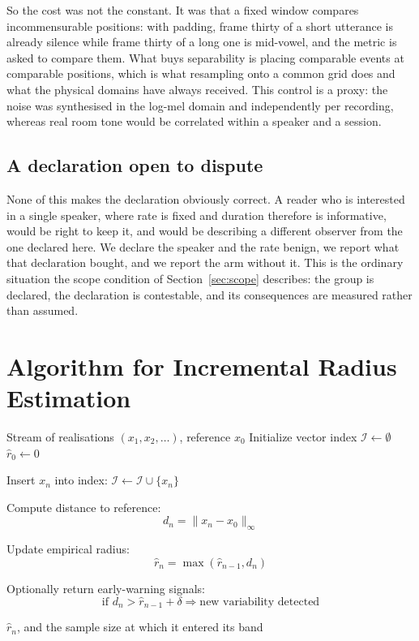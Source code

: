 \documentclass[10pt]{article}
\theoremstyle{plain}
\theoremstyle{definition}
\theoremstyle{remark}
\begin{document}
So the cost was not the constant. It was that a fixed window compares
incommensurable positions: with padding, frame thirty of a short utterance is
already silence while frame thirty of a long one is mid-vowel, and the metric
is asked to compare them. What buys separability is placing comparable events
at comparable positions, which is what resampling onto a common grid does and
what the physical domains have always received. This control is a proxy: the
noise was synthesised in the log-mel domain and independently per recording,
whereas real room tone would be correlated within a speaker and a session.

\subsection{A declaration open to dispute}

None of this makes the declaration obviously correct. A reader who is
interested in a single speaker, where rate is fixed and duration therefore is
informative, would be right to keep it, and would be describing a different
observer from the one declared here. We declare the speaker and the rate benign,
we report what that declaration bought, and we report the arm without it. This
is the ordinary situation the scope condition of Section~\ref{sec:scope}
describes: the group is declared, the declaration is contestable, and its
consequences are measured rather than assumed.


\section{Algorithm for Incremental Radius Estimation}\label{app:algorithm}
\begin{algorithm}[H]
\caption{Incremental Estimation of the Perceptual Radius}
\begin{algorithmic}[1]

\Require Stream of realisations $(x_1, x_2, \dots)$, reference $x_0$
\State Initialize vector index $\mathcal{I} \gets \emptyset$
\State $\hat r_0 \gets 0$


    \State Insert $x_n$ into index: $\mathcal{I} \gets \mathcal{I} \cup \{x_n\}$
    
    \State Compute distance to reference:
    \[
       d_n = \|x_n - x_0\|_\infty
    \]
    
    \State Update empirical radius:
    \[
        \hat r_n = \max(\hat r_{n-1}, d_n)
    \]
    
    \State Optionally return early-warning signals:
    \[
    \text{if } d_n > \hat r_{n-1} + \delta 
       \Rightarrow \text{new variability detected}
    \]
    
\EndFor

\State \Return $\hat r_n$, and the sample size at which it entered its band
\end{algorithmic}
\end{algorithm}
\end{document}
